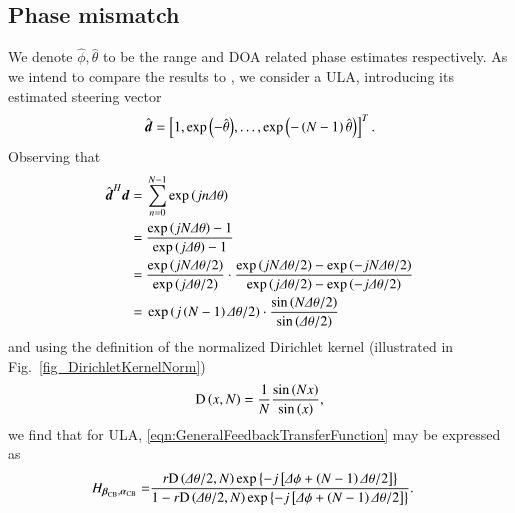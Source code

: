 \subsection{Phase mismatch}
\label{subsec_error_trms}
We denote $\hat{\phi},\hat{\theta}$ to be the range and DOA related phase estimates respectively.
As we intend to compare the results to \cite{van2004optimum}, we consider a ULA, introducing its estimated steering vector
\begin{equation}\label{eq_est_d_ULA}
\hat{\boldsymbol{d}} = \left[{1, \exp{\left({-\hat{\theta}}\right)}, \hdots, \exp{\left({-\left({N-1}\right)\hat{\theta}}\right)}}\right]^{T}.
\end{equation}
Observing that
\begin{equation*}
    \begin{split}
        \hat{\boldsymbol{d}}^{H}\boldsymbol{d} =&\ \sum_{n=0}^{N-1}\exp{\left({jn\Delta\theta}\right)} \\
        =&\ \frac{\exp{\left({jN\Delta\theta}\right)}-1}{\exp{\left({j\Delta\theta}\right)}-1}\\
        =&\ \frac{\exp{\left({jN\Delta\theta/2}\right)}}{\exp{\left({j\Delta\theta/2}\right)}}\cdot
        \frac{\exp{\left({jN\Delta\theta/2}\right)}-\exp{\left({-jN\Delta\theta/2}\right)}}
        {\exp{\left({j\Delta\theta/2}\right)}-\exp{\left({-j\Delta\theta/2}\right)}}\\
        =&\ \exp{\left({j\left({N-1}\right)\Delta\theta/2}\right)}\cdot
        \frac{\sin{\left({N\Delta\theta/2}\right)}}
        {\sin{\left({\Delta\theta/2}\right)}}
    \end{split}
\end{equation*}
and using the definition of the normalized Dirichlet kernel (illustrated in Fig.~\ref{fig_DirichletKernelNorm})
\[
\text{D}\left({x,N}\right)
=\frac{1}{N}\frac{\sin\left({Nx}\right)}{\sin\left({x}\right)},
\]
we find that for ULA, \eqref{eqn:GeneralFeedbackTransferFunction} may be expressed as
\begin{equation}\label{eq:alpha_beta_hat}
    \begin{split}
        H_{\boldsymbol{\beta}_{\text{CB}},\boldsymbol{\alpha}_{\text{CB}}}
        = &\frac{r\text{D}\left({\Delta\theta/2,N}\right)\exp\left\{{-j\left[{\Delta\phi+\left({N-1}\right)\Delta\theta/2}\right]}\right\}}{1-r\text{D}\left({\Delta\theta/2,N}\right)\exp\left\{{-j\left[{\Delta\phi+\left({N-1}\right)\Delta\theta/2}\right]}\right\}}.
    \end{split}
\end{equation}

